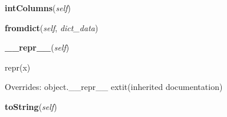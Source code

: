     \label{db_layer:User:intColumns}

    \vspace{0.5ex}

\hspace{.8\funcindent}\begin{boxedminipage}{\funcwidth}

    \raggedright \textbf{intColumns}(\textit{self})

\setlength{\parskip}{2ex}
\setlength{\parskip}{1ex}
    \end{boxedminipage}

    \label{db_layer:User:fromdict}

    \vspace{0.5ex}

\hspace{.8\funcindent}\begin{boxedminipage}{\funcwidth}

    \raggedright \textbf{fromdict}(\textit{self}, \textit{dict\_data})

\setlength{\parskip}{2ex}
\setlength{\parskip}{1ex}
    \end{boxedminipage}

    \vspace{0.5ex}

\hspace{.8\funcindent}\begin{boxedminipage}{\funcwidth}

    \raggedright \textbf{\_\_repr\_\_}(\textit{self})

\setlength{\parskip}{2ex}
    repr(x)

\setlength{\parskip}{1ex}
      Overrides: object.\_\_repr\_\_ 	extit{(inherited documentation)}

    \end{boxedminipage}

    \label{db_layer:User:toString}

    \vspace{0.5ex}

\hspace{.8\funcindent}\begin{boxedminipage}{\funcwidth}

    \raggedright \textbf{toString}(\textit{self})

\setlength{\parskip}{2ex}
\setlength{\parskip}{1ex}
    \end{boxedminipage}

